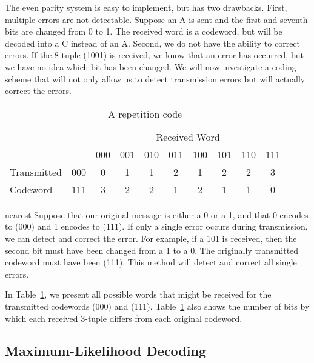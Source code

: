  
The even parity system is easy to implement, but has two drawbacks.
First, multiple errors are not detectable. Suppose an A is sent and 
the first and seventh bits are changed from 0 to 1. The received word
is a codeword, but will be decoded into a C instead of an A.
Second, we do not have the ability to correct errors.  If the 8-tuple
(1001) is received, we know that an error has occurred, but we
have no idea which bit has been changed. We will now investigate a
coding scheme that will not only allow us to detect transmission
errors but will actually correct the errors. 

 
 
\begin{table}[htb]\label{repetition_code}
\begin{center}{\small
\begin{tabular}{|lc|cccccccc|}
\hline
& & \multicolumn{8}{|c|}{Received Word}    \\
            &     & 000 & 001 & 010 & 011 & 100 & 101 & 110
& 111 \\ \hline
Transmitted & 000 & 0   & 1   & 1   & 2   & 1   & 2   & 2
& 3 \\
Codeword   & 111 & 3   &  2  & 2   &  1  &  2  &   1 &  1
&  0 \\ \hline
\end{tabular}
}
\caption{A repetition code}
\end{center}
\end{table}

 
\begin{example}{nearest}
Suppose that our original message is either a 0 or a 1, and that 0
encodes to (000) and 1 encodes to (111). If only a single
error occurs during transmission, we can detect and correct the
error. For example, if a 101 is received, then the second bit must
have been changed from a 1 to a 0.  The originally transmitted
codeword must have been (111). 	This method will detect and correct 
all single errors. 
 
 
In Table~\ref{repetition_code}, we present all possible words that might be received
for the transmitted codewords (000) and (111). Table~\ref{repetition_code} also shows 
the number of bits by which each received 3-tuple differs from each
original codeword. 
\end{example}
 
 
 
\subsection*{Maximum-Likelihood Decoding}

